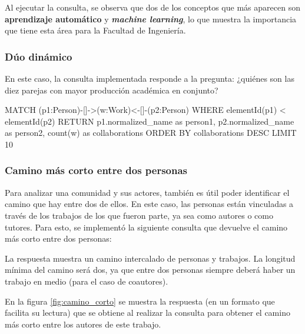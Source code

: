 \documentclass[journal]{IEEEtran}
\begin{document}
Al ejecutar la consulta, se observa que dos de los conceptos que más aparecen son \textbf{aprendizaje automático} y \textit{\textbf{machine learning}}, lo que muestra la importancia que tiene esta área para la Facultad de Ingeniería.

\subsubsection{Dúo dinámico}
En este caso, la consulta implementada responde a la pregunta: ¿quiénes son las diez parejas con mayor producción académica en conjunto?

\begin{sflisting}[style=sparql,caption= Parejas con mayor cantidad de artículos publicados en conjunto,label=duo_dinamico]
	MATCH (p1:Person)-[]->(w:Work)<-[]-(p2:Person)
	WHERE elementId(p1) < elementId(p2)
	RETURN p1.normalized_name as person1,
	p2.normalized_name as person2,
	count(w) as collaborations
	ORDER BY collaborations DESC
	LIMIT 10
\end{sflisting}

\subsubsection{Camino más corto entre dos personas}
Para analizar una comunidad y sus actores, también es útil poder identificar el camino que hay entre dos de ellos. En este caso, las personas están vinculadas a través de los trabajos de los que fueron parte, ya sea como autores o como tutores. Para esto, se implementó la siguiente consulta que devuelve el camino más corto entre dos personas:


La respuesta muestra un camino intercalado de personas y trabajos. La longitud mínima del camino será dos, ya que entre dos personas siempre deberá haber un trabajo en medio (para el caso de coautores).

En la figura \ref{fig:camino_corto} se muestra la respuesta (en un formato que facilita su lectura) que se obtiene al realizar la consulta para obtener el camino más corto entre los autores de este trabajo.
\end{document}
